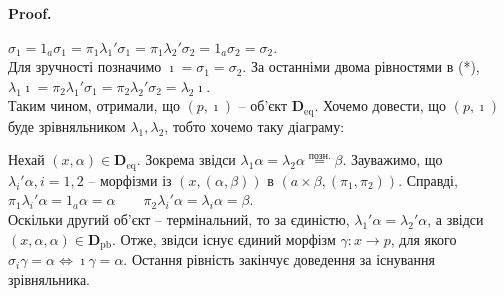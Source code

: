 \documentclass[a4paper, 10pt]{article}
\makeatletter
\theoremstyle{theoremdd}
\renewenvironment{proof}[1][Proof.\\]{\par
\pushQED{\hfill \qed}%
\normalfont \topsep6\p@\@plus6\p@\relax
\trivlist
\item\relax
{\bfseries
#1\@addpunct{.}}\hspace\labelsep\ignorespaces
}{%
\popQED\endtrivlist\@endpefalse
}
\makeatother
\begin{document}
\begin{proof}
$\sigma_1 = 1_a \sigma_1 = \pi_1 \lambda_1' \sigma_1 = \pi_1 \lambda_2' \sigma_2 = 1_a \sigma_2 = \sigma_2$.\\
Для зручності позначимо $\imath = \sigma_1 = \sigma_2$. За останніми двома рівностями в (*),\\
$\lambda_1 \imath = \pi_2 \lambda_1' \sigma_1 = \pi_2 \lambda_2' \sigma_2 = \lambda_2 \imath$.\\
Таким чином, отримали, що $(p,\imath)$ -- об'єкт $\textbf{D}_{\text{eq}}$. Хочемо довести, що $(p,\imath)$ буде зрівняльником $\lambda_1,\lambda_2$, тобто хочемо таку діаграму:
\begin{figure}[H]
\centering
{}
\end{figure}
\noindent
Нехай $(x,\alpha) \in \textbf{D}_{\text{eq}}$. Зокрема звідси $\lambda_1 \alpha = \lambda_2 \alpha \overset{\text{позн.}}{=} \beta$. Зауважимо, що $\lambda_i' \alpha, i = 1,2$ -- морфізми із $(x,(\alpha,\beta))$ в $(a \times \beta, (\pi_1,\pi_2))$. Справді,\\
$\pi_1 \lambda_i' \alpha = 1_a \alpha = \alpha \qquad \pi_2 \lambda_i' \alpha = \lambda_i \alpha = \beta$.\\
Оскільки другий об'єкт -- термінальний, то за єдиністю, $\lambda_1' \alpha = \lambda_2' \alpha$, а звідси $(x,\alpha,\alpha) \in \textbf{D}_{\text{pb}}$. Отже, звідси існує єдиний морфізм $\gamma \colon x \to p$, для якого $\sigma_i \gamma = \alpha \iff \imath \gamma = \alpha$. Остання рівність закінчує доведення за існування зрівняльника.
\end{proof}
\end{document}

